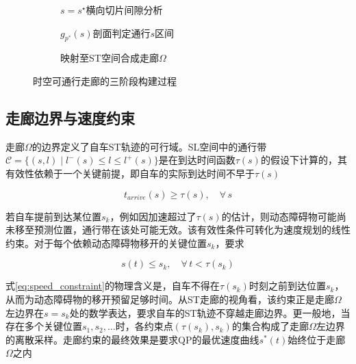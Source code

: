 \begin{figure}[htbp]
\centering
\begin{subfigure}[b]{0.32\textwidth}
  \centering
  \caption{$s=s^\star$横向切片间隙分析}
  \label{fig:corridor_gen:a}
\end{subfigure}\hfill
\begin{subfigure}[b]{0.32\textwidth}
  \centering
  \caption{$g_{p^*}(s)$剖面判定通行$s$区间}
  \label{fig:corridor_gen:b}
\end{subfigure}\hfill
\begin{subfigure}[b]{0.32\textwidth}
  \centering
  \caption{映射至ST空间合成走廊$\Omega$}
  \label{fig:corridor_gen:c}
\end{subfigure}
\caption{时空可通行走廊的三阶段构建过程}
\label{fig:corridor_gen}
\end{figure}

\subsection{走廊边界与速度约束}
\label{sec:corridor_speed_constraint}
走廊$\Omega$的边界定义了自车ST轨迹的可行域。SL空间中的通行带$\mathcal{C} = \{(s, l) \mid l^{-}(s) \leq l \leq l^{+}(s)\}$是在到达时间函数$\tau(s)$的假设下计算的，其有效性依赖于一个关键前提，即自车的实际到达时间不早于$\tau(s)$

\begin{equation}
    t_{arrive}(s) \geq \tau(s), \quad \forall\, s
    \label{eq:validity_condition}
\end{equation}

若自车提前到达某位置$s_k$，例如因加速超过了$\tau(s)$的估计，则动态障碍物可能尚未移至预测位置，通行带在该处可能无效。该有效性条件可转化为速度规划的线性约束。对于每个依赖动态障碍物移开的关键位置$s_k$，要求

\begin{equation}
    s(t) \leq s_k, \quad \forall\, t < \tau(s_k)
    \label{eq:speed_constraint}
\end{equation}

式\eqref{eq:speed_constraint}的物理含义是，自车不得在$\tau(s_k)$时刻之前到达位置$s_k$，从而为动态障碍物的移开预留足够时间。从ST走廊的视角看，该约束正是走廊$\Omega$左边界在$s = s_k$处的数学表达，要求自车的ST轨迹不穿越走廊边界。更一般地，当存在多个关键位置$s_1, s_2, \ldots$时，各约束点$(\tau(s_k), s_k)$的集合构成了走廊$\Omega$左边界的离散采样。走廊约束的最终效果是要求QP的最优速度曲线$s^*(t)$始终位于走廊$\Omega$之内

